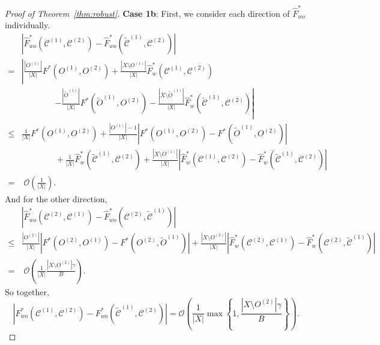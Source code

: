 \documentclass[10pt,a4paper]{amsart}
\newcommand{\bigO}{\mathcal{O}}
\newcommand\cCone{\mathcal{C}^{(1)}}
\newcommand\cCtwo{\mathcal{C}^{(2)}}
\newcommand\tcCone{\tilde{\mathcal{C}}^{(1)}}
\begin{document}
\begin{proof}[Proof of Theorem~\ref{thm:robust}]
    \textbf{Case 1b}:
    First, we consider each direction of $\hat{F}^*_{wo}$ individually.     
    \begin{align*}
        & \left| \hat{F}^*_{wo}(\cCone, \cCtwo) - \hat{F}^*_{wo}(\tcCone, \cCtwo) \right| \\
        = & \left| \frac{|O^{(1)}|}{|X|}F^*(O^{(1)}, O^{(2)}) + \frac{|X \setminus O^{(1)}|}{|X|}\hat{F}^*_w(\cCone, \cCtwo) \right. \\
        & \qquad \qquad \left. - \frac{|\tilde{O}^{(1)}|}{|X|}F^*(\tilde{O}^{(1)}, O^{(2)}) - \frac{|X \setminus \tilde{O}^{(1)}|}{|X|}\hat{F}^*_w(\tcCone, \cCtwo) \right| \\
        \leq & \frac{1}{|X|}F^*(O^{(1)}, O^{(2)}) + \frac{|O^{(1)}|-1}{|X|}\left|F^*(O^{(1)}, O^{(2)}) - F^*(\tilde{O}^{(1)}, O^{(2)})\right| \\
        & \qquad \qquad + \frac{1}{|X|}\hat{F}^*_w(\tcCone, \cCtwo) + \frac{|X \setminus O^{(1)}|}{|X|} \left|\hat{F}^*_w(\cCone, \cCtwo) - \hat{F}^*_w(\tcCone, \cCtwo) \right| \\
        = & \; \bigO \left( \frac{1}{|X|} \right).
    \end{align*}
    And for the other direction,
    \begin{align*}
        & \left| \hat{F}^*_{wo}(\cCtwo, \cCone) - \hat{F}^*_{wo}(\cCtwo, \tcCone) \right| \\
        \leq & \frac{|O^{(2)}|}{|X|}\left| F^*(O^{(2)}, O^{(1)}) - F^*(O^{(2)}, \tilde{O}^{(1)})\right| + \frac{|X \setminus O^{(2)}|}{|X|}\left| \hat{F}^*_w(\cCtwo, \cCone) - \hat{F}^*_w(\cCtwo, \tcCone)\right|\\
        = & \; \bigO \left( \frac{1}{|X|} \frac{|X \setminus O^{(2)}| \gamma}{B}\right).
    \end{align*}
    So together,
    \begin{equation*}
        \left| F^*_{wo}(\cCone, \cCtwo) - F^*_{wo}(\tcCone, \cCtwo) \right| = \bigO \left( \frac{1}{|X|} \max \left\{ 1, \frac{|X \setminus O^{(2)}| \gamma}{B} \right\} \right).
    \end{equation*}


\end{proof}
\end{document}
